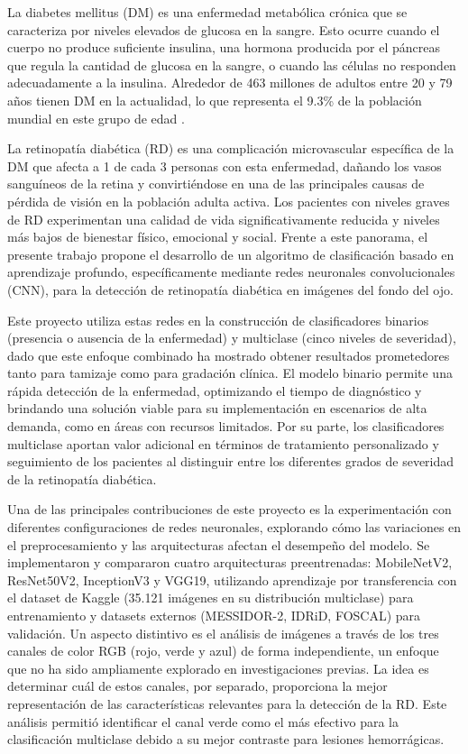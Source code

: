 
 \label{chap:introduccion}

La diabetes mellitus (DM) es una enfermedad metabólica crónica que se caracteriza por
niveles elevados de glucosa en la sangre. Esto ocurre cuando el cuerpo no produce
suficiente insulina, una hormona producida por el páncreas que regula la cantidad de
glucosa en la sangre, o cuando las células no responden adecuadamente a la insulina.
Alrededor de 463 millones de adultos entre 20 y 79 años tienen DM en
la actualidad, lo que representa el 9.3\% de la población mundial en este grupo de edad
.

La retinopatía diabética (RD) es una complicación
microvascular específica de la DM que afecta a 1 de cada 3 personas
con esta enfermedad, dañando los vasos sanguíneos de la retina y convirtiéndose en una de
las principales causas de pérdida de visión en la población adulta activa. Los pacientes
con niveles graves de RD experimentan una calidad de vida significativamente reducida y
niveles más bajos de bienestar físico, emocional y social. Frente a este panorama, el 
presente trabajo propone el desarrollo de un algoritmo de
clasificación basado en aprendizaje profundo, específicamente mediante redes neuronales
convolucionales (CNN), para la detección de retinopatía diabética en imágenes del fondo
del ojo. 

Este proyecto utiliza estas redes en la construcción de clasificadores binarios
(presencia o ausencia de la enfermedad) y multiclase (cinco niveles de severidad), dado que
este enfoque combinado ha mostrado obtener resultados prometedores tanto para tamizaje como
para gradación clínica. El modelo binario permite una rápida detección de la enfermedad,
optimizando el tiempo de diagnóstico y brindando una solución viable para su implementación en
escenarios de alta demanda, como en áreas con recursos limitados. Por su parte, los
clasificadores multiclase aportan valor adicional en términos de tratamiento personalizado y
seguimiento de los pacientes al distinguir entre los diferentes grados de severidad de la retinopatía
diabética.

Una de las principales contribuciones de este proyecto es la experimentación con diferentes
configuraciones de redes neuronales, explorando cómo las variaciones en el preprocesamiento
y las arquitecturas afectan el desempeño del modelo. Se implementaron y compararon cuatro
arquitecturas preentrenadas: MobileNetV2, ResNet50V2, InceptionV3 y VGG19, utilizando
aprendizaje por transferencia con el dataset de Kaggle (35.121 imágenes en su
distribución multiclase) para entrenamiento y datasets externos (MESSIDOR-2, IDRiD,
FOSCAL) para validación. Un aspecto distintivo es
el análisis de imágenes a través de los tres canales de color RGB (rojo, verde y azul) de
forma independiente, un enfoque que no ha sido ampliamente explorado en investigaciones
previas. La idea es determinar cuál de estos canales, por separado, proporciona la mejor
representación de las características relevantes para la detección de la RD. Este análisis
permitió identificar el canal verde como el más efectivo para la clasificación multiclase
debido a su mejor contraste para lesiones hemorrágicas.

